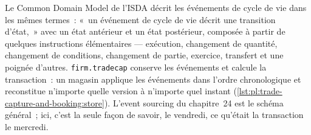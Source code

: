 Le Common Domain Model de l'ISDA décrit les événements de cycle de vie dans les mêmes termes~: «~un événement de cycle de vie décrit une transition d'état,~» avec un
état antérieur et un état postérieur, composée à partir de quelques instructions élémentaires --- exécution, changement de quantité, changement de conditions, changement de partie, exercice,
transfert et une poignée d'autres. \texttt{firm.tradecap} conserve les événements et calcule la transaction~: un magasin applique les événements dans l'ordre chronologique et
reconstitue n'importe quelle version à n'importe quel instant (\cref{lst:pl:trade-capture-and-booking:store}). L'event sourcing du chapitre~24 est le
schéma général~; ici, c'est la seule façon de savoir, le vendredi, ce qu'était la transaction le mercredi.

\label{lst:pl:trade-capture-and-booking:store}

\label{lst:pl:trade-capture-and-booking:step}

